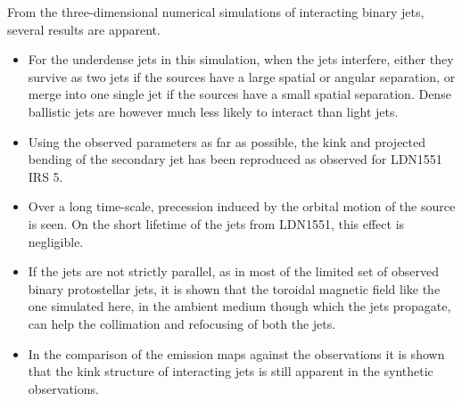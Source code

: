 From the three-dimensional numerical simulations of interacting binary jets, several results are apparent.
\begin{itemize}
\item 
For the underdense jets in this simulation, when the jets interfere, 
either they survive as two jets if the sources have a large spatial or angular separation, 
or merge into one single jet if the sources have a small spatial separation. 
Dense ballistic jets are however much less likely to interact than light jets.

\item Using the observed parameters as far as possible, the kink and projected bending of the secondary jet has been reproduced as observed for LDN1551 IRS 5.

\item Over a long time-scale, precession induced by the orbital motion of the source is seen.
On the short lifetime of the jets from LDN1551, this effect is negligible. 

\item If the jets are not strictly parallel, as in most of the limited set of observed binary protostellar jets, it is shown that
the toroidal magnetic field like the one simulated here, in the ambient medium though which the jets propagate, can help the collimation and refocusing of both the jets.

\item In the comparison of the emission maps against the observations
it is shown that the kink structure of interacting jets is still apparent in the synthetic 
observations. 


\end{itemize}

